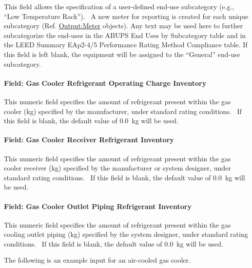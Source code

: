 This field allows the specification of a user-defined end-use subcategory (e.g., ``Low Temperature Rack'').~ A new meter for reporting is created for each unique subcategory (Ref. \hyperref[outputmeter-and-outputmetermeterfileonly]{Output:Meter} objects). Any text may be used here to further subcategorize the end-uses in the ABUPS End Uses by Subcategory table and in the LEED Summary EAp2-4/5 Performance Rating Method Compliance table. If this field is left blank, the equipment will be assigned to the ``General'' end-use subcategory.

\paragraph{Field: Gas Cooler Refrigerant Operating Charge Inventory}\label{field-gas-cooler-refrigerant-operating-charge-inventory}

This numeric field specifies the amount of refrigerant present within the gas cooler (kg) specified by the manufacturer, under standard rating conditions.~ If this field is blank, the default value of 0.0~kg will be used.

\paragraph{Field: Gas Cooler Receiver Refrigerant Inventory}\label{field-gas-cooler-receiver-refrigerant-inventory}

This numeric field specifies the amount of refrigerant present within the gas cooler receiver (kg) specified by the manufacturer or system designer, under standard rating conditions.~ If this field is blank, the default value of 0.0~kg will be used.

\paragraph{Field: Gas Cooler Outlet Piping Refrigerant Inventory}\label{field-gas-cooler-outlet-piping-refrigerant-inventory}

This numeric field specifies the amount of refrigerant present within the gas cooling outlet piping (kg) specified by the system designer, under standard rating conditions.~ If this field is blank, the default value of 0.0~kg will be used.

The following is an example input for an air-cooled gas cooler.

